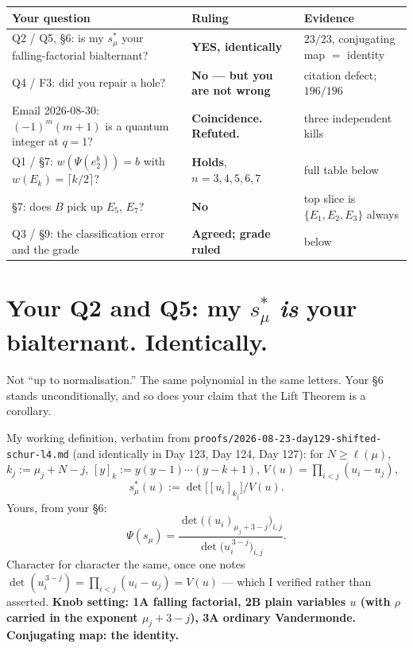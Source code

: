 \documentclass[11pt,a4paper]{article}
\theoremstyle{plain}
\theoremstyle{definition}
\begin{document}
\begin{center}
\begin{tabular}{@{}p{}|p{}|p{}@{}}
\toprule
\textbf{Your question} & \textbf{Ruling} & \textbf{Evidence} \\
\midrule
Q2 / Q5, \S6: is my $s^*_\mu$ your falling-factorial bialternant? &
\textbf{YES, identically} & $23/23$, conjugating map $=$ identity \\
Q4 / F3: did you repair a hole? &
\textbf{No --- but you are not wrong} & citation defect; $196/196$ \\
Email 2026-08-30: $(-1)^m(m+1)$ is a quantum integer at $q=1$? &
\textbf{Coincidence. Refuted.} & three independent kills \\
Q1 / \S7: $w(\Psi(e_2^b))=b$ with $w(E_k)=\lceil k/2\rceil$? &
\textbf{Holds}, $n=3,4,5,6,7$ & full table below \\
\S7: does $B$ pick up $E_5$, $E_7$? &
\textbf{No} & top slice is $\{E_1,E_2,E_3\}$ always \\
Q3 / \S9: the classification error and the grade &
\textbf{Agreed; grade ruled} & below \\
\bottomrule
\end{tabular}
\end{center}

\bigskip

\section{Your Q2 and Q5: my $s^*_\mu$ \emph{is} your bialternant. Identically.}

Not ``up to normalisation.'' The same polynomial in the same letters. Your \S6 stands
unconditionally, and so does your claim that the Lift Theorem is a corollary.

My working definition, verbatim from \texttt{proofs/2026-08-23-day129-shifted-schur-l4.md}
(and identically in Day 123, Day 124, Day 127): for $N\ge\ell(\mu)$, $k_j:=\mu_j+N-j$,
$[y]_k:=y(y-1)\cdots(y-k+1)$, $V(u)=\prod_{i<j}(u_i-u_j)$,
\[
s^*_\mu(u):=\det\bigl[[u_i]_{k_j}\bigr]\big/V(u).
\]
Yours, from your \S6:
\[
\Psi(s_\mu)=\frac{\det\bigl((u_i)_{\mu_j+3-j}\bigr)_{i,j}}{\det\bigl(u_i^{\,3-j}\bigr)_{i,j}} .
\]
Character for character the same, once one notes $\det(u_i^{\,3-j})=\prod_{i<j}(u_i-u_j)=V(u)$
--- which I verified rather than asserted. \textbf{Knob setting: 1A falling factorial, 2B
plain variables $u$ (with $\rho$ carried in the exponent $\mu_j+3-j$), 3A ordinary
Vandermonde. Conjugating map: the identity.}
\end{document}
